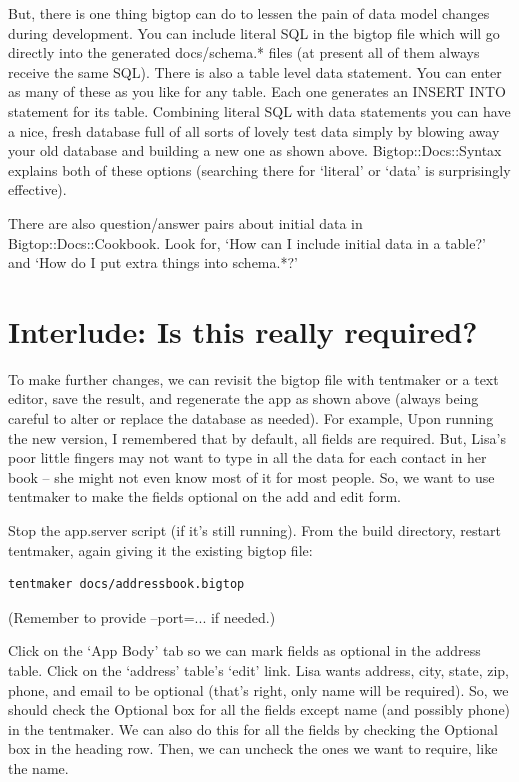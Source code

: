 But, there is one thing bigtop can do to lessen the pain of data model
changes during development.  You can include literal SQL in the bigtop
file which will go directly into the generated docs/schema.* files
(at present all of them always receive the same SQL).  There is also
a table level data statement.  You can enter as many of these
as you like for any table.  Each one generates an INSERT INTO statement
for its table.  Combining literal SQL with data statements you can
have a nice, fresh database full of all sorts of lovely test data
simply by blowing away your old database and building a new one as shown
above.  Bigtop::Docs::Syntax explains both of these options (searching
there for `literal' or `data' is surprisingly effective).

There are also question/answer pairs about initial data in
Bigtop::Docs::Cookbook.  Look for, `How can I include initial data in a table?'
and `How do I put extra things into schema.*?'

\section{Interlude: Is this really required?}

To make further changes, we can revisit the bigtop file with tentmaker
or a text editor, save the result, and regenerate the app as shown above
(always being careful to alter or replace the database as needed).  For
example, Upon running the new version, I remembered that by default, all
fields are required.  But, Lisa's poor little fingers may not want to type
in all the data for each contact in her book -- she might not even know
most of it for most people.  So, we want to use tentmaker to make the fields
optional on the add and edit form.

Stop the app.server script (if it's still running).  From the build directory,
restart tentmaker, again giving it the existing bigtop file:

\begin{verbatim}
tentmaker docs/addressbook.bigtop
\end{verbatim}

(Remember to provide --port=... if needed.)

Click on the `App Body' tab so we can mark fields as optional in the address
table.  Click on the `address' table's `edit' link.  Lisa wants address,
city, state, zip, phone, and email to be optional (that's right, only name
will be required).  So, we should check the Optional box for
all the fields except name (and possibly phone) in the tentmaker.
We can also do this for all the fields by checking the Optional box in the
heading row.  Then, we can uncheck the ones we want to require, like the
name.

